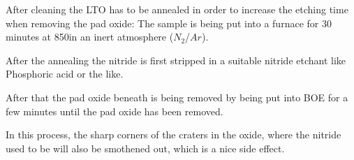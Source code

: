 After cleaning the LTO has to be annealed in order to increase the etching time when removing the pad oxide: The sample is being put into a furnace for 30 minutes at 850\degreesC in an inert atmosphere ($N_2$/$Ar$).

After the annealing the nitride is first stripped in a suitable nitride etchant like Phosphoric acid or the like.

After that the pad oxide beneath is being removed by being put into BOE for a few minutes until the pad oxide has been removed.

In this process, the sharp corners of the craters in the oxide, where the nitride used to be will also be smothened out, which is a nice side effect.

